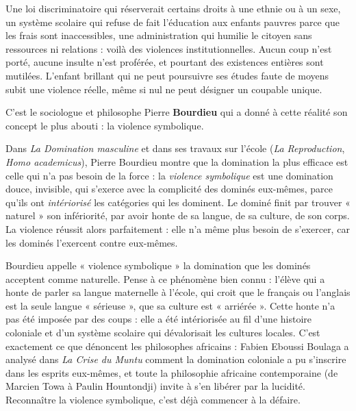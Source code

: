 \documentclass[11pt]{article}
\newcommand{\cle}[1]{{\popxbold\color{popdark}#1}}
\begin{document}
\begin{exemplebox}
Une loi discriminatoire qui réserverait certains droits à une ethnie ou à un sexe, un système scolaire qui refuse de fait l'éducation aux enfants pauvres parce que les frais sont inaccessibles, une administration qui humilie le citoyen sans ressources ni relations : voilà des violences institutionnelles. Aucun coup n'est porté, aucune insulte n'est proférée, et pourtant des existences entières sont mutilées. L'enfant brillant qui ne peut poursuivre ses études faute de moyens subit une violence réelle, même si nul ne peut désigner un coupable unique.
\end{exemplebox}

C'est le sociologue et philosophe Pierre \textbf{Bourdieu} qui a donné à cette réalité son concept le plus abouti : la \cle{violence symbolique}.

\begin{propriete}
Dans \emph{La Domination masculine} et dans ses travaux sur l'école (\emph{La Reproduction}, \emph{Homo academicus}), Pierre Bourdieu montre que la domination la plus efficace est celle qui n'a pas besoin de la force : la \emph{violence symbolique} est une domination douce, invisible, qui s'exerce avec la complicité des dominés eux-mêmes, parce qu'ils ont \emph{intériorisé} les catégories qui les dominent. Le dominé finit par trouver « naturel » son infériorité, par avoir honte de sa langue, de sa culture, de son corps. La violence réussit alors parfaitement : elle n'a même plus besoin de s'exercer, car les dominés l'exercent contre eux-mêmes.
\end{propriete}

\begin{savaistu}
Bourdieu appelle « violence symbolique » la domination que les dominés acceptent comme naturelle. Pense à ce phénomène bien connu : l'élève qui a honte de parler sa langue maternelle à l'école, qui croit que le français ou l'anglais est la seule langue « sérieuse », que sa culture est « arriérée ». Cette honte n'a pas été imposée par des coups : elle a été intériorisée au fil d'une histoire coloniale et d'un système scolaire qui dévalorisait les cultures locales. C'est exactement ce que dénoncent les philosophes africains : Fabien Eboussi Boulaga a analysé dans \emph{La Crise du Muntu} comment la domination coloniale a pu s'inscrire dans les esprits eux-mêmes, et toute la philosophie africaine contemporaine (de Marcien Towa à Paulin Hountondji) invite à s'en libérer par la lucidité. Reconnaître la violence symbolique, c'est déjà commencer à la défaire.
\end{savaistu}
\end{document}
